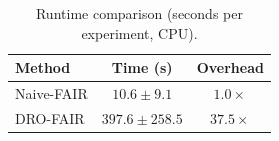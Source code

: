 \begin{table}[h]
\centering
\caption{Runtime comparison (seconds per experiment, CPU).}
\label{tab:runtime}
\begin{tabular}{lcc}
\toprule
Method & Time (s) & Overhead \\
\midrule
Naive-FAIR & $10.6 \pm 9.1$ & $1.0\times$ \\
DRO-FAIR & $397.6 \pm 258.5$ & $37.5\times$ \\
\bottomrule
\end{tabular}
\end{table}
